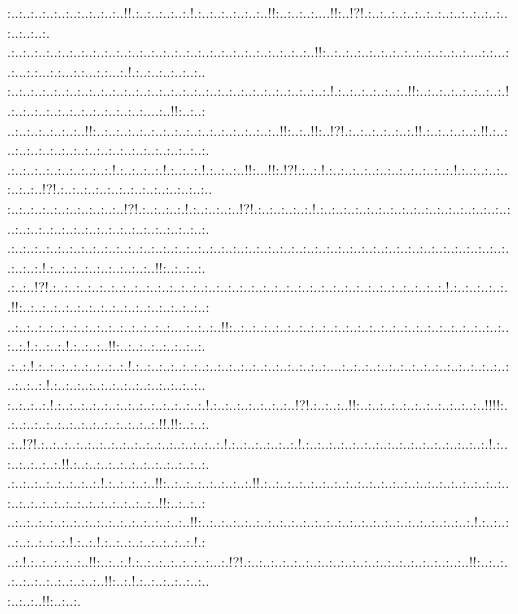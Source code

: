 \documentclass[paper=a4, fontsize=11pt]{scrartcl} %
\numberwithin{equation}{section} %
\numberwithin{figure}{section} %
\numberwithin{table}{section} %
\begin{document}
:..:..:..:..:..:..:..:..:..:..!!.:..:..:..:..:.!.:..:..:..:..:..:..!!:..:..:..:....!!:..!?!.:..:..:..:..:..:..:..:..:..:..:..:..:..:..:..:.\\.:..:..:..:..:..:..:..:..:..:..:..:..:..:..:..:..:..:..:..:..:..:..:..:..:..:..!!:..:..:..:..:..:..:..:..:..:..:..:..:....:.:...:.:...:.:...:.:...:.:...:.:...:.!.:..:..:..:..:..:..\\:..:..:..:..:..:..:..:..:..:..:..:..:..:..:..:..:..:..:..:..:..:..:..:..:..:..:..:.!.:..:..:..:..:..:..!!:..:..:..:..:..:..:..:.!.:..:..:..:..:..:..:..:..:..:..:..:....:..!!:..:..:\\..:..:..:..:..:..:..!!:..:..:..:..:..:..:..:..:..:..:..:..:..:..:..:..!!:..:..!!:..!?!.:..:..:..:..:..:.!!.:..:..:..:..:.!!.:..:..:..:..:..:..:..:..:..:..:..:..:..:..:..:..:..:..:.\\.:..:..:..:..:..:..:..:..:.!.:..:..:..:.!.:..:..:.!.:..:..:..!!:...!!:.!?!.:..:.!.:..:..:..:..:..:..:..:..:..:..:.!.:..:..:..:..:..:..:..!?!.:..:..:..:..:..:..:..:..:..:..:..:..:..\\:..:..:..:..:..:..:..:..:..:..!?!.:..:..:..:.!.:..:..:..:..!?!.:..:..:..:..:.!.:..:..:..:..:..:..:..:..:..:..:..:..:..:..:..:..:..:..:..:..:..:..:..:..:..:..:..:..:..:..:..:..:..:.\\.:..:..:..:..:..:..:..:..:..:..:..:..:..:..:..:..:..:..:..:..:..:..:..:..:..:..:..:..:..:..:..:..:..:..:..:..:..:..:..:..:..:..:..:..:..:.!.:..:..:..:..:..:..:..:..:..!!:..:..:..:.\\.:..:..!?!.:..:..:..:..:..:..:..:..:..:..:..:..:..:..:..:..:..:..:..:..:..:..:..:..:..:..:..:..:..:..:..:..:..:.!.:..:..:..:..:..!!:..:..:..:..:..:..:..:..:..:..:..:..:..:..:..:..:\\..:..:..:..:..:..:..:..:..:..:..:..:..:..:....:..:..:..!!:..:..:..:..:..:..:..:..:..:..:..:..:..:..:..:..:..:..:..:..:..:..:..:..:..:.!.:..:..:.!.:..:..:..!!:..:..:..:..:..:..:..:.\\.:..:.!.:..:..:..:..:..:..:..:.!.:..:..:..:..:..:..:..:..:..:..:..:..:..:..:..:..:....:..:..:..:..:..:..:..:..:..:..:..:..:..:..:..:..:..:.!.:..:..:..:..:..:..:..:..:..:..:..:..:..\\:..:..:..:.!.:..:..:..:..:..:..:..:..:..:..:..:..:.!.:..:..:..:..:..:..:..!?!.:..:..:..!!:..:..:..:..:..:..:..:..:..:..:..!!!!:..:..:..:..:..:..:..:..:..:..:..:..:..:.!!.!!:..:..:.\\.:..!?!.:..:..:..:..:..:..:..:..:..:..:..:..:..:..:..:.!.:..:..:..:..:..:.!.:..:..:..:..:..:..:..:..:..:..:..:..:..:..:..:.!.:..:..:..:..:..:.!!.:..:..:..:..:..:..:..:..:..:..:..:.\\.:..:..:..:..:..:..:..:.!.:..:..:..:..!!:..:..:..:..:..:..:..:.!!.:..:..:..:..:..:..:..:..:..:..:..:..:..:..:..:..:..:..:..:..:..:..:..:..:..:..:..:..:..:..:..:..:..:..!!:..:..:..:\\..:..:..:..:..:..:..:..:..:..:..:..:..:..:..:..!!:..:..:..:..:..:..:..:..:..:..:..:..:..:..:..:..:..:..:..:..:..:..:..:.!.:..:..:..:..:..:..:..:.!.:..:.!.:..:..:..:..:..:..:..:.!.:\\..:.!.:..:..:..:..:..!!:..:..:.!.:..:..:..:..:..:..:...:.!?!.:..:..:..:..:..:..:..:..:..:..:..:..:..:..:..:..:..:..:..!!:..:..:..:..:..:..:..:..:..:..:..!!:..:.!.:..:..:..:..:..:..\\:..:..:..!!:..:..:.
\end{document}
